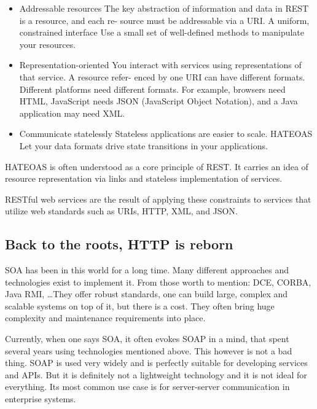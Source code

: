 	\begin{itemize}
	  \item Addressable resources 
	  	The key abstraction of information and data in REST is a resource, and each re-
		source must be addressable via a \gls{URI}.
		A uniform, constrained interface
		Use a small set of well-defined methods to manipulate your resources.
		\item Representation-oriented 
		You interact with services using representations of that service. A resource refer-
		enced by one URI can have different formats. Different platforms need different
		formats. For example, browsers need HTML, JavaScript needs JSON (JavaScript
		Object Notation), and a Java application may need XML.
		\item Communicate statelessly
		Stateless applications are easier to scale.
		\gls{HATEOAS}
		Let your data formats drive state transitions in your applications.
	\end{itemize}
	
	\gls{HATEOAS} is often understood as a core principle of \gls{REST}. It carries an idea of resource representation via
	links and stateless implementation of services.
	
	RESTful web services are the result of applying these constraints to services that utilize web standards such as
	\gls{URI}s, \gls{HTTP}, \gls{XML}, and \gls{JSON}.
	
	\subsection{Back to the roots, HTTP is reborn}
	
	\gls{SOA} has been in this world for a long time. Many different approaches and technologies exist to implement it.
	From those worth to mention: DCE, CORBA, Java RMI, \ldots They offer robust standards, one can build large, complex
	and scalable systems on top of it, but there is a cost. They often bring huge complexity and maintenance requirements
	into place.
	
	Currently, when one says \gls{SOA}, it often evokes \gls{SOAP} in a mind, that spent several years using technologies
	mentioned above. This however is not a bad thing. \gls{SOAP} is used very widely and is perfectly suitable for
	developing services and \gls{API}s. But it is definitely not a lightweight technology and it is not ideal for
	everything. Its most common use case is for server-server communication in enterprise systems.
	
